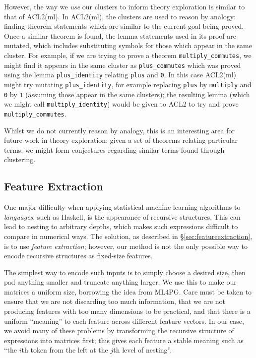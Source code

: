 However, the way we \emph{use} our clusters to inform theory exploration is similar to that of ACL2(ml). In ACL2(ml), the clusters are used to reason by analogy: finding theorem statements which are similar to the current goal being proved. Once a similar theorem is found, the lemma statements used in its proof are mutated, which includes substituting symbols for those which appear in the same cluster. For example, if we are trying to prove a theorem \texttt{multiply\_commutes}, we might find it appears in the same cluster as \texttt{plus\_commutes} which was proved using the lemma \texttt{plus\_identity} relating \texttt{plus} and \texttt{0}. In this case ACL2(ml) might try mutating \texttt{plus\_identity}, for example replacing \texttt{plus} by \texttt{multiply} and \texttt{0} by \texttt{1} (assuming those appear in the same clusters); the resulting lemma (which we might call \texttt{multiply\_identity}) would be given to ACL2 to try and prove \texttt{multiply\_commutes}.

Whilst we do not currently reason by analogy, this is an interesting area for future work in theory exploration: given a set of theorems relating particular terms, we might form conjectures regarding similar terms found through clustering.

\iffalse
We could expand this a bit, e.g. talking about how we both use Weka, etc.
\fi

\subsection{Feature Extraction}

One major difficulty when applying statistical machine learning algorithms to \emph{languages}, such as Haskell, is the appearance of recursive structures. This can lead to nesting to arbitrary depths, which makes such expressions difficult to compare in numerical ways. The solution, as described in \S \ref{sec:featureextraction}, is to use \emph{feature extraction}; however, our method is not the only possible way to encode recursive structures as fixed-size features.

The simplest way to encode such inputs is to simply choose a desired size, then pad anything smaller and truncate anything larger. We use this to make our matrices a uniform size, borrowing the idea from ML4PG. Care must be taken to ensure that we are not discarding too much information, that we are not producing features with too many dimensions to be practical, and that there is a uniform ``meaning'' to each feature across different feature vectors. In our case, we avoid many of these problems by transforming the recursive structure of expressions into matrices first; this gives each feature a stable meaning such as ``the $i$th token from the left at the $j$th level of nesting''.

